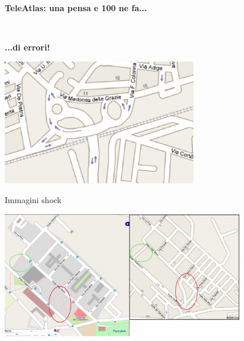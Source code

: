 \documentclass[slidestop,compress,red,notes,xcolor=dvipsnames]{beamer}	%
\begin{document}
        \begin{frame}
        \vspace{1.5cm}
        \begin{center}
            \begin{huge}\textbf{TeleAtlas: una pensa e 100 ne fa...}\end{huge}\\
            \begin{footnotesize}\textbf{...di errori!}
            \end{footnotesize}
        \end{center}
        \end{frame}

        \begin{frame}
            \vspace{1cm}
            \begin{center}
                \includegraphics[height=5.5cm]{images/mappe/sottopasso.eps}
            \end{center}
        \end{frame}

        \begin{frame}{Immagini shock}
            \begin{center}
                \includegraphics[height=5.5cm]{images/mappe/casafra.eps}
            \end{center}
        \end{frame}
\end{document}
